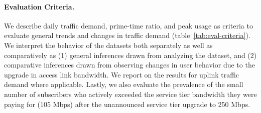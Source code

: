 \paragraph{Evaluation Criteria. } We describe daily traffic demand, 
prime-time ratio, and peak usage as criteria to evaluate general trends 
and changes in traffic demand (table~\ref{tab:eval-criteria}). We interpret the 
behavior of the datasets both separately as well as comparatively as (1) 
general inferences drawn from analyzing the dataset,  and (2) comparative 
inferences drawn from observing changes in user behavior due to the upgrade in 
access link bandwidth. We report on the results for uplink traffic 
demand where applicable. Lastly, we also evaluate the prevalence of the 
small number of subscribers who actively exceeded the service tier bandwidth 
they were paying for (105 Mbps) after the unannounced service tier upgrade to 
250 Mbps.








